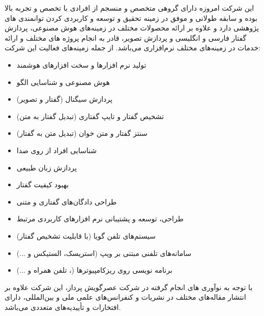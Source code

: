 این شرکت امروزه دارای گروهی متخصص و منسجم از افرادی با تخصص و تجربه بالا بوده و سابقه طولانی و موفق در زمینه تحقیق و توسعه و کاربردی کردن توانمندی های پژوهشی دارد و علاوه بر ارائه محصولات مختلف در زمینه‌های هوش مصنوعی، پردازش گفتار فارسی و انگلیسی و پردازش تصویر، قادر به انجام پروژه های مختلف و ارائه خدمات در زمینه‌های مختلف نرم‌افزاری می‌باشد. از جمله زمینه‌های فعالیت این شرکت:
\begin{itemize}
	\item تولید نرم افزارها و سخت افزارهای هوشمند
	\item هوش مصنوعی و شناسایی الگو
	\item پردازش سیگنال (گفتار و تصویر)
	\item تشخیص گفتار و تایپ گفتاری (تبدیل گفتار به متن)
	\item سنتز گفتار و متن خوان (تبدیل متن به گفتار)
	\item شناسایی افراد از روی صدا
	\item پردازش زبان طبیعی
	\item بهبود كیفیت گفتار
	\item طراحی دادگان‌های گفتاری و متنی
	\item طراحی، توسعه و پشتیبانی نرم افزارهای کاربردی مرتبط
	\item سیستم‌های تلفن گویا (با قابلیت تشخیص گفتار)
	\item سامانه‌های تلفنی مبتنی بر ویپ (استریسک، الستیکس و ...)
	\item برنامه نویسی روی ریزکامپیوترها (، تلفن همراه و ...)
\end{itemize}

با توجه به نوآوری های انجام گرفته در شركت عصرگویش پرداز، این شرکت علاوه بر انتشار مقاله‌های مختلف در نشریات و کنفرانس‌های علمی ملی و بین‌المللی، دارای افتخارات و تأییدیه‌های متعددی می‌باشد.